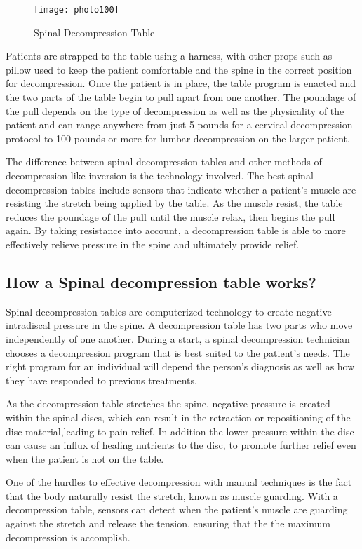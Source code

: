 \documentclass[12pt]{article}
\begin{document}
\begin{figure}[h]
\centering
\texttt{[image: photo100]}
\caption{Spinal Decompression Table}
\end{figure}

Patients are strapped to the table using a harness, with other props such as pillow used to keep the patient comfortable and the spine in the correct position for decompression. Once the patient is in place, the table program is enacted and the two parts of the table begin to pull apart from one another. The poundage of the pull depends on the type of decompression as well as the physicality of the patient and can range anywhere from just 5 pounds for a cervical decompression protocol to 100 pounds or more for lumbar decompression on the larger patient. 

The difference between spinal decompression tables and other methods of decompression like inversion is the technology involved. The best spinal decompression tables include sensors that indicate whether a patient's muscle are resisting the stretch being applied by the table. As the muscle resist, the table reduces the poundage of the pull until the muscle relax, then begins the pull again. By taking resistance into account, a decompression table is able to more effectively relieve pressure in the spine and ultimately provide relief.


\subsection{How a Spinal decompression table works?}
Spinal decompression tables are computerized technology to create negative intradiscal pressure in the spine. A decompression table has two parts who move independently of one another. During a start, a spinal decompression technician chooses a decompression program that is best suited to the patient's needs. The right program for an individual will depend the person's diagnosis as well as how they have responded to previous treatments.

As the decompression table stretches the spine, negative pressure is created within the spinal discs, which can result in the retraction or repositioning of the disc material,leading to pain relief. In addition the lower pressure within the disc can cause an influx of healing nutrients to the disc, to promote further relief even when the patient is not on the table. 

One of the hurdles to effective decompression with manual techniques is the fact that the body naturally resist the stretch, known as muscle guarding. With a decompression table, sensors can detect when the patient's muscle are guarding against the stretch and release the tension, ensuring that the the maximum decompression is accomplish. 
\end{document}
